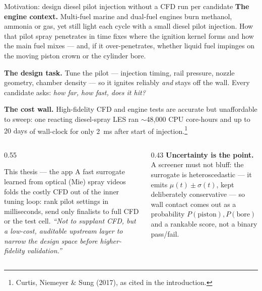 \documentclass[aspectratio=169,11pt]{beamer}
\newcommand{\good}[1]{\textcolor{goodGreen}{#1}}
\newcommand{\warn}[1]{\textcolor{warnRed}{#1}}
\newcommand{\blue}[1]{\textcolor{aaltoBlue}{#1}}
\begin{document}
\begin{frame}{Motivation: design diesel pilot injection without a CFD run per candidate}
\footnotesize
\textbf{The engine context.} Multi-fuel marine and dual-fuel engines burn methanol, ammonia or gas, yet
still light each cycle with a small \blue{diesel pilot injection}. How that pilot spray \blue{penetrates in
time} fixes where the ignition kernel forms and how the main fuel mixes --- and, if it over-penetrates,
whether liquid fuel \warn{impinges on the moving piston crown or the cylinder bore}.

\smallskip
\textbf{The design task.} Tune the pilot --- injection timing, rail pressure, nozzle geometry, chamber
density --- so it ignites reliably \emph{and} stays off the wall. Every candidate asks: \emph{how far, how
fast, does it hit?}

\smallskip
\textbf{The cost wall.} High-fidelity CFD and engine tests are accurate but \warn{unaffordable to sweep}:
one reacting diesel-spray LES ran \warn{$\sim$48{,}000 CPU core-hours and up to 20 days} of wall-clock for
only \warn{\SI{2}{ms}} after start of injection.\footnote{\tiny Curtis, Niemeyer \& Sung (2017), as cited in the introduction.}

\smallskip
\begin{columns}[T,onlytextwidth]
\begin{column}{0.55\linewidth}
\begin{block}{This thesis --- the app}
A fast \blue{surrogate} learned from optical (Mie) spray videos \good{folds the costly CFD out of the inner
tuning loop}: rank pilot settings in \good{milliseconds}, send only finalists to full CFD or the test cell.
\emph{``Not to supplant CFD, but a low-cost, auditable upstream layer to \good{narrow the design space}
before higher-fidelity validation.''}
\end{block}
\end{column}
\begin{column}{0.43\linewidth}
\textbf{\blue{Uncertainty is the point.}} A screener must not bluff: the surrogate is \blue{heteroscedastic}
--- it emits \blue{$\mu(t)\pm\sigma(t)$}, kept \good{deliberately conservative} --- so wall contact comes
out as a \blue{probability} $P(\text{piston}),P(\text{bore})$ and a rankable score, \warn{not} a binary
pass/fail.
\end{column}
\end{columns}
\end{frame}
\end{document}
